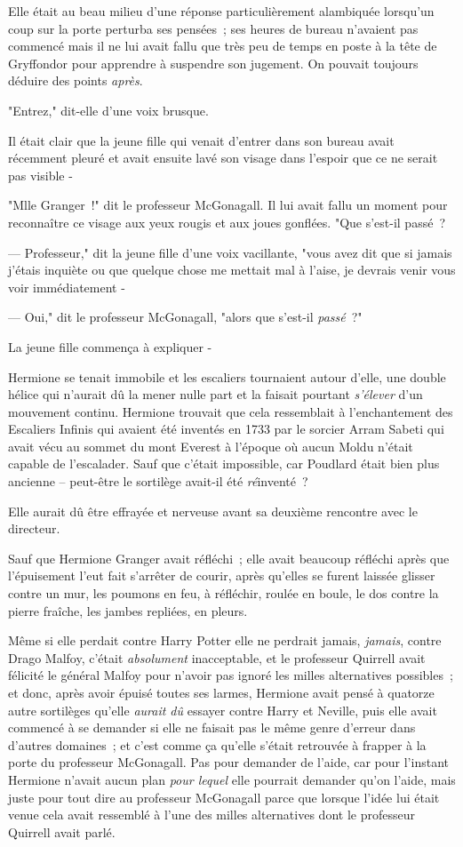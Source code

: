 Elle était au beau milieu d'une réponse particulièrement alambiquée lorsqu'un coup sur la porte perturba ses pensées~; ses heures de bureau n'avaient pas commencé mais il ne lui avait fallu que très peu de temps en poste à la tête de Gryffondor pour apprendre à suspendre son jugement. On pouvait toujours déduire des points \emph{après}.

"Entrez," dit-elle d'une voix brusque.

Il était clair que la jeune fille qui venait d'entrer dans son bureau avait récemment pleuré et avait ensuite lavé son visage dans l'espoir que ce ne serait pas visible -

"Mlle Granger~!" dit le professeur McGonagall. Il lui avait fallu un moment pour reconnaître ce visage aux yeux rougis et aux joues gonflées. "Que s'est-il passé~?

--- Professeur," dit la jeune fille d'une voix vacillante, "vous avez dit que si jamais j'étais inquiète ou que quelque chose me mettait mal à l'aise, je devrais venir vous voir immédiatement -

--- Oui," dit le professeur McGonagall, "alors que s'est-il \emph{passé}~?"

La jeune fille commença à expliquer -

\later

Hermione se tenait immobile et les escaliers tournaient autour d'elle, une double hélice qui n'aurait dû la mener nulle part et la faisait pourtant \emph{s'élever} d'un mouvement continu. Hermione trouvait que cela ressemblait à l'enchantement des Escaliers Infinis qui avaient été inventés en 1733 par le sorcier Arram Sabeti qui avait vécu au sommet du mont Everest à l'époque où aucun Moldu n'était capable de l'escalader. Sauf que c'était impossible, car Poudlard était bien plus ancienne -- peut-être le sortilège avait-il été \emph{ré}inventé~?

Elle aurait dû être effrayée et nerveuse avant sa deuxième rencontre avec le directeur.

Sauf que Hermione Granger avait réfléchi~; elle avait beaucoup réfléchi après que l'épuisement l'eut fait s'arrêter de courir, après qu'elles se furent laissée glisser contre un mur, les poumons en feu, à réfléchir, roulée en boule, le dos contre la pierre fraîche, les jambes repliées, en pleurs.

Même si elle perdait contre Harry Potter elle ne perdrait jamais, \emph{jamais}, contre Drago Malfoy, c'était \emph{absolument} inacceptable, et le professeur Quirrell avait félicité le général Malfoy pour n'avoir pas ignoré les milles alternatives possibles~; et donc, après avoir épuisé toutes ses larmes, Hermione avait pensé à quatorze autre sortilèges qu'elle \emph{aurait dû} essayer contre Harry et Neville, puis elle avait commencé à se demander si elle ne faisait pas le même genre d'erreur dans d'autres domaines~; et c'est comme ça qu'elle s'était retrouvée à frapper à la porte du professeur McGonagall. Pas pour demander de l'aide, car pour l'instant Hermione n'avait aucun plan \emph{pour lequel} elle pourrait demander qu'on l'aide, mais juste pour tout dire au professeur McGonagall parce que lorsque l'idée lui était venue cela avait ressemblé à l'une des milles alternatives dont le professeur Quirrell avait parlé.

